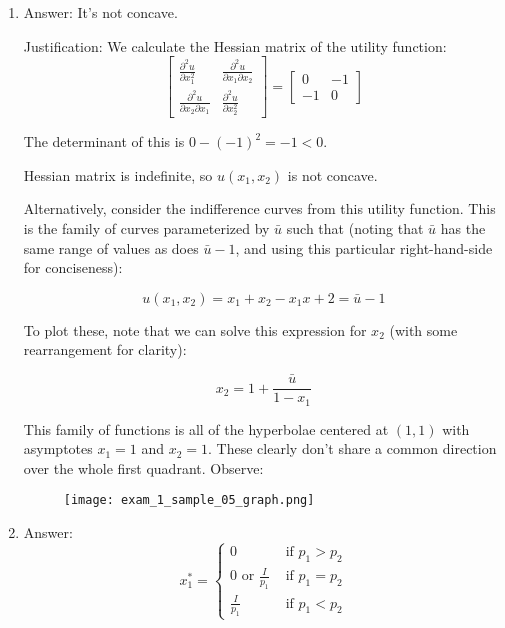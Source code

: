 \documentclass{article}
\newenvironment{solution}{\color{red}}{\color{black}}
\begin{document}
\begin{solution}

\begin{enumerate}
\item 
Answer: It's not concave.

Justification: We calculate the Hessian matrix of the utility function:
\[ \left[
\begin{array}{cc}
\frac{\partial^2 u}{\partial x_1^2}   & \frac{\partial^2 u}{\partial x_1\partial x_2} \\
\frac{\partial^2 u}{\partial x_2 \partial x_1}  & \frac{\partial^2 u}{\partial x_2^2}
\end{array}
\right]
=
\left[
\begin{array}{cc}
0  & -1\\
-1 & 0
\end{array}
\right] \]

The determinant of this is $0-(-1)^2=-1<0$.

Hessian matrix is indefinite, so $u(x_1, x_2)$ is not concave.

Alternatively, consider the indifference curves from this utility function. This is the family of curves parameterized by $\bar{u}$ such that (noting that $\bar{u}$ has the same range of values as does $\bar{u} - 1$, and using this particular right-hand-side for conciseness):

\[ u(x_1, x_2) = x_1 + x_2 - x_1 x+2 = \bar{u} - 1\]

To plot these, note that we can solve this expression for $x_2$ (with some rearrangement for clarity):

\[x_2 = 1 + \frac{\bar{u}}{1-x_1} \]

This family of functions is all of the hyperbolae centered at $(1, 1)$ with asymptotes $x_1 = 1$ and $x_2 = 1$. These clearly don't share a common direction over the whole first quadrant. Observe:

\begin{figure}[htbp]
\centering
\texttt{[image: exam\_1\_sample\_05\_graph.png]}
\end{figure}

\item 
Answer: 
\[
x_1^* = \left\{
\begin{array}{ll}
0 & \text{ if } p_1>p_2 \\
0 \text{ or } \frac{I}{p_1} & \text{ if } p_1=p_2 \\
\frac{I}{p_1} & \text{ if } p_1<p_2
\end{array}
\right.
\]


\end{enumerate}
\end{solution}
\end{document}

